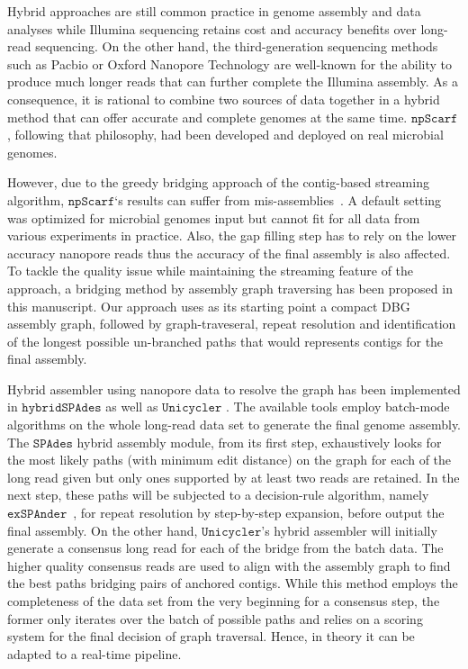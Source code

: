 \documentclass[10pt,letterpaper]{article}
\newcommand{\npscarf}{$\mathtt{npScarf}$}
\newcommand{\unicycler}{$\mathtt{Unicycler}$}
\newcommand{\spades}{$\mathtt{SPAdes}$}
\begin{document}
Hybrid approaches are still common practice in genome assembly and data analyses while Illumina sequencing retains cost and accuracy benefits over long-read sequencing.
On the other hand, the third-generation sequencing methods such as Pacbio or Oxford Nanopore Technology are well-known for the ability to produce much longer reads that can further complete the Illumina assembly.
As a consequence, it is rational to combine two sources of data together in a hybrid method that can offer accurate and complete genomes at the same time.
\npscarf{}, following that philosophy, had been developed and deployed on real microbial genomes.

However, due to the greedy bridging approach of the contig-based streaming algorithm, \npscarf{}`s results can suffer from mis-assemblies~\cite{Wick2017unicycler,Giordano2017}. 
A default setting was optimized for microbial genomes input but cannot fit for all data from various experiments in practice.
Also, the gap filling step has to rely on the lower accuracy nanopore reads thus the accuracy of the final assembly is also affected. 
To tackle the quality issue while maintaining the streaming feature of the approach, a bridging method by assembly graph traversing has been proposed in this manuscript. 
Our approach uses as its starting point a compact DBG assembly graph, followed by graph-traveseral, repeat resolution and identification of the longest possible un-branched paths that would represents contigs for the final assembly.

Hybrid assembler using nanopore data to resolve the graph has been implemented in $\mathtt{hybridSPAdes}$ \cite{AntipovKM2015} as well as \unicycler{} \cite{Wick2017unicycler}. 
The available tools employ batch-mode algorithms on the whole long-read data set to generate the final genome assembly. 
The \spades{} hybrid assembly module, from its first step, exhaustively looks for the most likely paths (with minimum edit distance) on the graph for each of the long read given but only ones supported by at least two reads are retained. In the next step, these paths will be subjected to a decision-rule algorithm, namely $\mathtt{exSPAnder}$~\cite{Prjibelski2014}, for repeat resolution by step-by-step expansion, before output the final assembly.
On the other hand, \unicycler{}'s hybrid assembler will initially generate a consensus long read for each of the bridge from the batch data. 
The higher quality consensus reads are used to align with the assembly graph to find the best paths bridging pairs of anchored contigs.
While this method employs the completeness of the data  set from the very beginning for a consensus step, the former only iterates over the batch of possible paths and relies on a scoring system for the final decision of graph traversal. Hence, in theory it can be adapted to a real-time pipeline.
    
\end{document}
